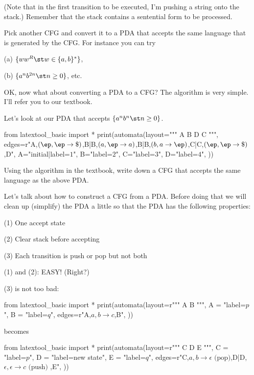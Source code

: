 (Note that in the first transition to be executed, I'm pushing a string onto
the stack.)
Remember that the stack contains a sentential form to be processed.

\newpage
\begin{ex}
Pick another CFG and convert it to a PDA that accepts the same language that is
generated by the CFG. 
For instance you can try
\begin{tightlist}
  \item[(a)] $\{ww^R \st w \in \{a, b\}^*\}$, 
  \item[(b)] $\{a^n b^{2n} \st n \geq 0 \}$, etc.
\end{tightlist}
\end{ex}

\newpage
OK, now what about converting a PDA to a CFG?
The algorithm is very simple.
I'll refer you to our textbook.

\begin{eg}
Let's look at our PDA that accepts $\{a^n b^n \st n \geq 0\}$.
\begin{center}
\begin{python}
from latextool_basic import *
print(automata(layout="""
A  B
D  C
""",
edges=r"A,$(\ep,\ep\rightarrow\$)$,B|B,$(a, \ep\rightarrow a)$,B|B,$(b,a\rightarrow\ep)$,C|C,$(\ep,\ep\rightarrow \$)$,D",
A="initial|label=$1$",
B="label=$2$",
C="label=$3$",
D="label=$4$",
))
\end{python}
\end{center}
Using the algorithm in the textbook, write down a CFG that accepts the same
language as the above PDA.
\end{eg}


Let's talk about how to construct a CFG from a PDA.
Before doing that we will clean up (simplify) the PDA a little so that
the PDA has the following properties:
\begin{mylist}
 \item[(1)] One accept state
 \item[(2)] Clear stack before accepting
 \item[(3)] Each transition is push or pop but not both
\end{mylist}
(1) and (2): EASY! (Right?)

(3) is not too bad:
\begin{python}
from latextool_basic import *
print(automata(layout=r"""
A  B
""",
A = "label=$p$",
B = "label=$q$",
edges=r"A,$a, b\rightarrow c$,B",
))
\end{python}
becomes
\begin{python}
from latextool_basic import *
print(automata(layout=r"""
C    D    E
""",
C = "label=$p$",
D = "label=new state",
E = "label=$q$",
edges=r"C,$a,b\rightarrow\epsilon\text{ (pop)}$,D|D,$\epsilon,\epsilon\rightarrow c\text{ (push)}$ ,E",
))
\end{python}


